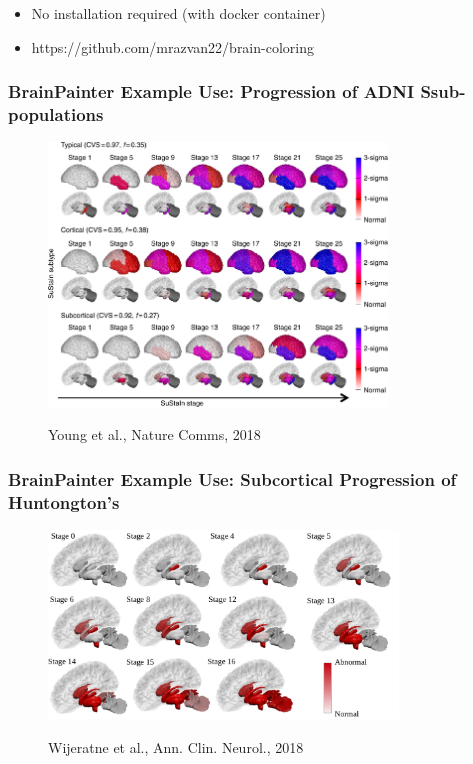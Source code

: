 \documentclass[8pt,xcolor=table]{beamer}
\begin{document}
\begin{frame}[label=current]
\begin{figure}
\end{figure}

\begin{itemize}
 \item No installation required (with docker container)
 \item https://github.com/mrazvan22/brain-coloring
\end{itemize}

\end{frame}

\begin{frame}[label=current]
\frametitle{BrainPainter Example Use: Progression of ADNI Ssub-populations}


\begin{figure}
\centering
\includegraphics[height=7cm,trim=0 0 0 0, clip]{young_brains}

Young et al., Nature Comms, 2018

\end{figure}


\end{frame}




\begin{frame}[label=current]
\frametitle{BrainPainter Example Use: Subcortical Progression of Huntongton's}


\begin{figure}
\centering

\includegraphics[height=5cm]{hd_peter}

Wijeratne et al., Ann. Clin. Neurol., 2018 
\end{figure}


\end{frame}
\end{document}
